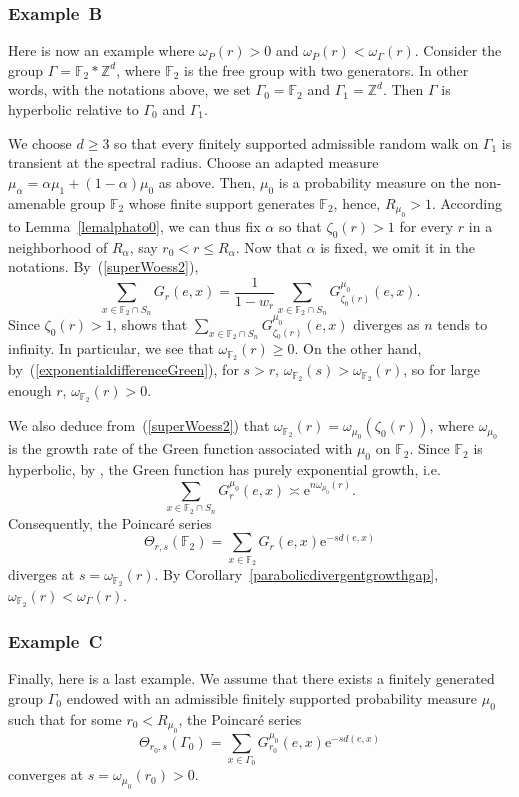 \documentclass{amsart}
\theoremstyle{definition}
\theoremstyle{remark}
\begin{document}
\subsubsection{Example~B}

Here is now an example where $\omega_P(r)>0$ and $\omega_P(r)<\omega_\Gamma(r)$.
Consider the group
$\Gamma=\mathbb F_2*\mathbb{Z}^d$, where $\mathbb F_2$ is the free group with two generators.
In other words, with the notations above, we set $\Gamma_0=\mathbb F_2$ and $\Gamma_1=\mathbb{Z}^d$.
Then $\Gamma$ is hyperbolic relative to $\Gamma_0$ and $\Gamma_1$.

We choose $d\geq 3$ so that every finitely supported admissible random walk on $\Gamma_1$ is transient at the spectral radius.
Choose an adapted measure $\mu_\alpha=\alpha\mu_1+(1-\alpha)\mu_0$ as above.
Then, $\mu_0$ is a probability measure on the non-amenable group $\mathbb F_2$ whose finite support generates $\mathbb F_2$,
hence, $R_{\mu_0}>1$.
According to Lemma~\ref{lemalphato0}, we can thus fix $\alpha$ so that $\zeta_0(r)>1$ for every $r$ in a neighborhood of $R_\alpha$, say $r_0< r\leq R_\alpha$.
Now that $\alpha$ is fixed, we omit it in the notations.
By~(\ref{superWoess2}),
$$\sum_{x\in \mathbb F_2\cap S_n}G_r(e,x)=\frac{1}{1-w_r}\sum_{x\in \mathbb F_2\cap S_n}G_{\zeta_0(r)}^{\mu_0}(e,x).$$
Since $\zeta_0(r)>1$, \cite[Note~1.7]{GouezelLalley} shows that
$\sum_{x\in \mathbb F_2\cap S_n}G_{\zeta_0(r)}^{\mu_0}(e,x)$ diverges as $n$ tends to infinity.
In particular, we see that $\omega_{\mathbb F_2}(r)\geq 0$.
On the other hand, by~(\ref{exponentialdifferenceGreen}), for $s>r$, $\omega_{\mathbb F_2}(s)>\omega_{\mathbb F_2}(r)$, so for large enough $r$, $\omega_{\mathbb F_2}(r)>0$.

We also deduce from~(\ref{superWoess2}) that $\omega_{\mathbb F_2}(r)=\omega_{\mu_0}(\zeta_0(r))$, where $\omega_{\mu_0}$ is the growth rate of the Green function associated with $\mu_0$ on $\mathbb F_2$.
Since $\mathbb F_2$ is hyperbolic, by \cite[Theorem~3.1]{SWX}, the Green function has purely exponential growth, i.e.
$$\sum_{x\in \mathbb F_2\cap S_n}G_r^{\mu_0}(e,x)\asymp \mathrm{e}^{n\omega_{\mu_0}(r)}.$$
Consequently, the Poincaré series
$$\Theta_{r,s}(\mathbb F_2)=\sum_{x\in \mathbb F_2}G_r(e,x)\mathrm{e}^{-sd(e,x)}$$
diverges at $s=\omega_{\mathbb F_2}(r)$.
By Corollary~\ref{parabolicdivergentgrowthgap}, $\omega_{\mathbb F_2}(r)<\omega_\Gamma(r)$.



\subsubsection{Example~C}
Finally, here is a last example.
We assume that there exists a finitely generated group $\Gamma_0$ endowed with an admissible finitely supported probability measure $\mu_0$ such that for some $r_0< R_{\mu_0}$, the Poincaré series
$$\Theta_{r_0,s}(\Gamma_0)=\sum_{x\in \Gamma_0}G_{r_0}^{\mu_0}(e,x)\mathrm{e}^{-sd(e,x)}$$
converges at $s=\omega_{\mu_0}(r_0)>0$.
\end{document}
